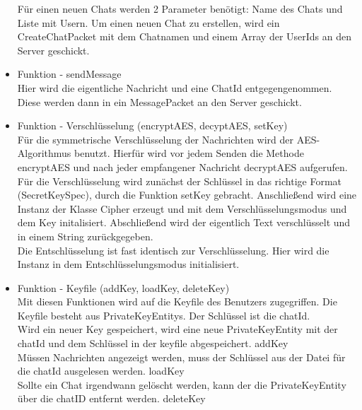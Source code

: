 \begin{itemize}
    Für einen neuen Chats werden 2 Parameter benötigt: Name des Chats und Liste mit Usern. Um einen neuen Chat zu
    erstellen, wird ein CreateChatPacket mit dem Chatnamen und einem Array der UserIds an den Server geschickt.
    
    \item Funktion - sendMessage\\
    Hier wird die eigentliche Nachricht und eine ChatId entgegengenommen. Diese werden dann in ein MessagePacket an
    den Server geschickt.
    
    \item Funktion - Verschlüsselung (encryptAES, decyptAES, setKey) \\
    Für die symmetrische Verschlüsselung der Nachrichten wird der AES-Algorithmus benutzt. Hierfür wird vor jedem Senden
    die Methode encryptAES und nach jeder empfangener Nachricht decryptAES aufgerufen.\\
    Für die Verschlüsselung wird zunächst der Schlüssel in das richtige Format (SecretKeySpec), durch die Funktion
    setKey gebracht. Anschließend wird eine Instanz der Klasse Cipher erzeugt und mit dem Verschlüsselungsmodus und
    dem Key initalisiert. Abschließend wird der eigentlich Text verschlüsselt und in einem String zurückgegeben. \\
    Die Entschlüsselung ist fast identisch zur Verschlüsselung. Hier wird die Instanz in dem Entschlüsselungsmodus
    initialisiert.
    
    \item Funktion - Keyfile (addKey, loadKey, deleteKey) \\
    Mit diesen Funktionen wird auf die Keyfile des Benutzers zugegriffen. Die Keyfile besteht aus PrivateKeyEntitys.
    Der Schlüssel ist die chatId. \\
    Wird ein neuer Key gespeichert, wird eine neue PrivateKeyEntity mit der chatId und dem Schlüssel in der keyfile
    abgespeichert. addKey\\
    Müssen Nachrichten angezeigt werden, muss der Schlüssel aus der Datei für die chatId ausgelesen werden. loadKey \\
    Sollte ein Chat irgendwann gelöscht werden, kann der die PrivateKeyEntity über die chatID entfernt werden. deleteKey\\
    

\end{itemize}
